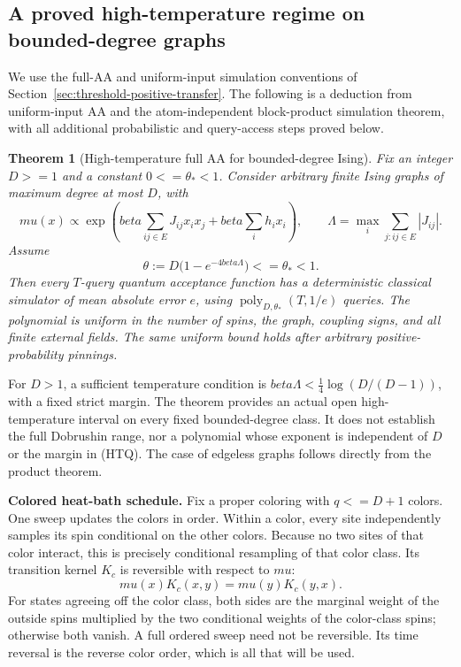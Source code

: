 \documentclass[11pt]{article}
\newtheorem{theorem}{Theorem}[section]
\theoremstyle{definition}
\theoremstyle{remark}
\def\beta{beta}\def\gamma{gamma}\def\lambda{lambda}%
\def\mu{mu}\def\rho{rho}\def\le{<=}\def\ge{>=}%
\begin{document}
\subsection{A proved high-temperature regime on bounded-degree graphs}
\label{resolution-dynamics:theorem}

We use the full-AA and uniform-input simulation conventions of
Section~\ref{sec:threshold-positive-transfer}. The following is a deduction from uniform-input
AA and the atom-independent block-product simulation theorem, with all
additional probabilistic and query-access steps proved below.

\begin{theorem}[High-temperature full AA for bounded-degree Ising]
\label{thm:resolution-dynamics-ising}
Fix an integer \(D\ge1\) and a constant \(0\le\theta_*<1\). Consider
arbitrary finite Ising graphs of maximum degree at most \(D\), with
\[
 \mu(x)\propto\exp\left(
     \beta\sum_{ij\in E}J_{ij}x_ix_j+\beta\sum_i h_ix_i\right),
 \qquad
 \Lambda=\max_i\sum_{j:ij\in E}|J_{ij}|.
\]
Assume
\[
 \theta:=D\bigl(1-e^{-4\beta\Lambda}\bigr)\le\theta_*<1.
 \tag{HTQ}
\]
Then every \(T\)-query quantum acceptance function has a deterministic
classical simulator of mean absolute error \(e\), using
\(\operatorname{poly}_{D,\theta_*}(T,1/e)\) queries. The polynomial
is uniform in the number of spins, the graph, coupling signs, and all
finite external fields. The same uniform bound holds after arbitrary
positive-probability pinnings.
\end{theorem}

For \(D>1\), a sufficient temperature condition is
\(\beta\Lambda<\frac14\log(D/(D-1))\), with a fixed strict margin.
The theorem provides an actual open high-temperature interval on every
fixed bounded-degree class. It does not establish the full Dobrushin
range, nor a polynomial whose exponent is independent of \(D\) or the
margin in (HTQ). The case of edgeless graphs follows directly from the
product theorem.

\textbf{Colored heat-bath schedule.}
Fix a proper coloring with \(q\le D+1\) colors. One sweep updates the
colors in order. Within a color, every site independently samples its
spin conditional on the other colors. Because no two sites of that
color interact, this is precisely conditional resampling of that color
class. Its transition kernel \(K_c\) is reversible with respect to
\(\mu\):
\[
 \mu(x)K_c(x,y)=\mu(y)K_c(y,x).
 \tag{DB}
\]
For states agreeing off the color class, both sides are the marginal
weight of the outside spins multiplied by the two conditional weights
of the color-class spins; otherwise both vanish. A full ordered sweep
need not be reversible. Its time reversal is the reverse color order,
which is all that will be used.
\end{document}
